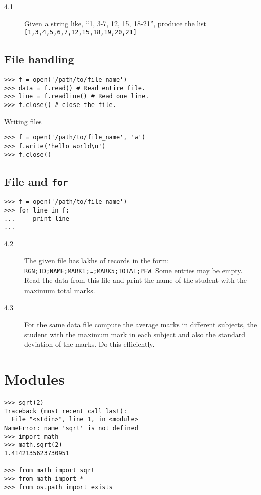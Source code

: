 \documentclass[12pt]{article}
\begin{document}
  \begin{description}
    \item[4.1] Given a string like, ``1, 3-7, 12, 15, 18-21'', produce the list\\
      \texttt{[1,3,4,5,6,7,12,15,18,19,20,21]}
\end{description}

  \subsection{File handling}
\begin{verbatim}
>>> f = open('/path/to/file_name')
>>> data = f.read() # Read entire file.
>>> line = f.readline() # Read one line.
>>> f.close() # close the file.
\end{verbatim}
Writing files
\begin{verbatim}
>>> f = open('/path/to/file_name', 'w')
>>> f.write('hello world\n')
>>> f.close()
\end{verbatim}

    \subsection{File and \texttt{for}}
\begin{verbatim}
>>> f = open('/path/to/file_name')
>>> for line in f:
...     print line
...
\end{verbatim}

  \begin{description}
    \item[4.2] The given file has lakhs of records in the form:
    \texttt{RGN;ID;NAME;MARK1;\ldots;MARK5;TOTAL;PFW}.
    Some entries may be empty.  Read the data from this file and print the
    name of the student with the maximum total marks.
  \item[4.3] For the same data file compute the average marks in different
    subjects, the student with the maximum mark in each subject and also
    the standard deviation of the marks.  Do this efficiently.
\end{description}

\section{Modules}
\begin{verbatim}
>>> sqrt(2)
Traceback (most recent call last):
  File "<stdin>", line 1, in <module>
NameError: name 'sqrt' is not defined
>>> import math        
>>> math.sqrt(2)
1.4142135623730951

>>> from math import sqrt
>>> from math import *
>>> from os.path import exists
\end{verbatim}
\end{document}

